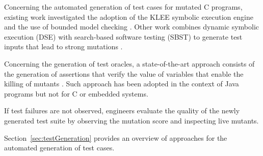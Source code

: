 
Concerning the automated generation of test cases for mutated C programs, existing work investigated the adoption of the KLEE symbolic execution engine \cite{holling2016nequivack} and the use of bounded model checking \cite{riener2011test}. Other work combines dynamic symbolic execution (DSE) with search-based software testing (SBST) to generate test inputs that lead to strong mutations \cite{harman2011strong}. 

Concerning the generation of test oracles, a state-of-the-art approach consists of the generation of assertions that verify the value of variables that enable the killing of mutants \cite{fraser2011mutation}. Such approach has been adopted in the context of Java programs but not for C or embedded systems.


If test failures are not observed, engineers evaluate the quality of the newly generated test suite by observing the mutation score and inspecting live mutants. 

Section~\ref{sec:testGeneration} provides an overview of approaches for the automated generation of test cases.

